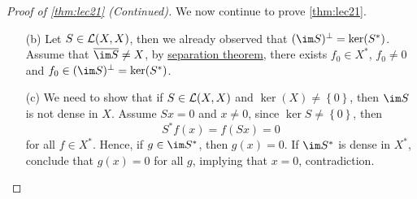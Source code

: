 \begin{proof}[Proof of \autoref{thm:lec21} (Continued)]
	We now continue to prove \autoref{thm:lec21}.
	\begin{enumerate}
		\item[(b)] Let \(S\in \mathcal{\MakeUppercase{l}} (X, X)\), then we already observed that \((\im S)^{\perp} = \ker(S^{\ast} )\). Assume that \(\overline{\im S} \neq X\), by \hyperref[thm:separation-of-convex-sets]{separation theorem}, there exists \(f_0\in X^{\ast} \), \(f_0 \neq 0\) and \(f_0 \in (\im S)^{\perp} = \ker(S^{\ast} )\).
		\item[(c)] We need to show that if \(S\in \mathcal{\MakeUppercase{l}} (X, X)\) and \(\ker(X) \neq \left\{ 0 \right\} \), then \(\im S\) is not dense in \(X\). Assume \(Sx = 0\) and \(x \neq 0\), since \(\ker S \neq \left\{ 0 \right\} \), then
			\[
				S^{\ast} f(x) = f(Sx) = 0
			\]
			for all \(f\in X^{\ast} \). Hence, if \(g\in \im S^{\ast} \), then \(g(x) = 0\). If \(\im S^{\ast} \) is dense in \(X^{\ast} \), conclude that \(g(x) = 0\) for all \(g\), implying that \(x = 0\), contradiction.
	\end{enumerate}
\end{proof}

